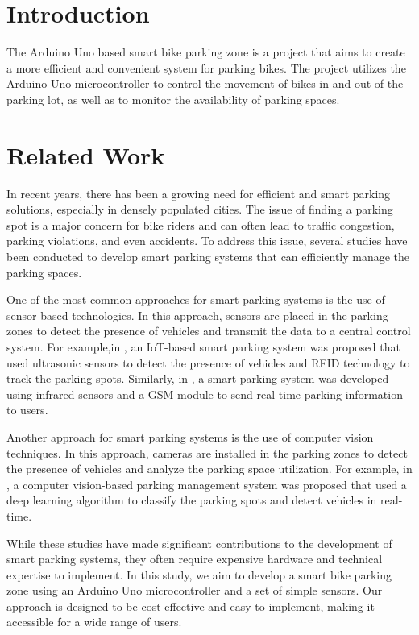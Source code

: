 \documentclass[conference]{IEEEtran}
\begin{document}
	\section{Introduction}
	The Arduino Uno based smart bike parking zone is a project that aims to create a more efficient and convenient system for parking bikes. The project utilizes the Arduino Uno microcontroller to control the movement of bikes in and out of the parking lot, as well as to monitor the availability of parking spaces. 
	{}
	\section{Related Work}
	In recent years, there has been a growing need for efficient and smart parking solutions, especially in densely populated cities. The issue of finding a parking spot is a major concern for bike riders and can often lead to traffic congestion, parking violations, and even accidents. To address this issue, several studies have been conducted to develop smart parking systems that can efficiently manage the parking spaces.
	
	One of the most common approaches for smart parking systems is the use of sensor-based technologies. In this approach, sensors are placed in the parking zones to detect the presence of vehicles and transmit the data to a central control system. For example,in \cite{b1}, an IoT-based smart parking system was proposed that used ultrasonic sensors to detect the presence of vehicles and RFID technology to track the parking spots. Similarly, in \cite{b2}, a smart parking system was developed using infrared sensors and a GSM module to send real-time parking information to users.
	
	Another approach for smart parking systems is the use of computer vision techniques. In this approach, cameras are installed in the parking zones to detect the presence of vehicles and analyze the parking space utilization. For example, in \cite{b3}, a computer vision-based parking management system was proposed that used a deep learning algorithm to classify the parking spots and detect vehicles in real-time.
	
	While these studies have made significant contributions to the development of smart parking systems, they often require expensive hardware and technical expertise to implement. In this study, we aim to develop a smart bike parking zone using an Arduino Uno microcontroller and a set of simple sensors. Our approach is designed to be cost-effective and easy to implement, making it accessible for a wide range of users.
	
\end{document}
